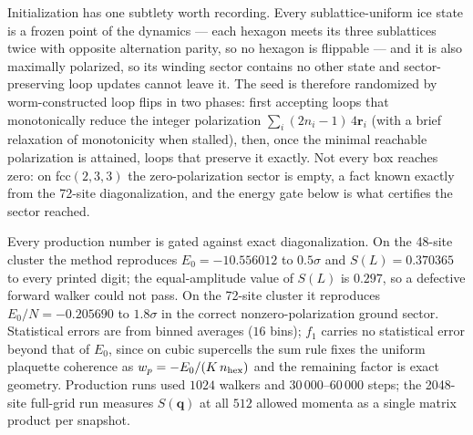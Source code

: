\documentclass[aps,prl,twocolumn,amsmath,amssymb,superscriptaddress,
longbibliography,floatfix]{revtex4-2}
\newcommand{\bq}{\bm q}
\begin{document}
Initialization has one subtlety worth recording. Every
sublattice-uniform ice state is a frozen point of the dynamics ---
each hexagon meets its three sublattices twice with opposite
alternation parity, so no hexagon is flippable --- and it is also
maximally polarized, so its winding sector contains no other state and
sector-preserving loop updates cannot leave it. The seed is therefore
randomized by worm-constructed loop flips in two phases: first
accepting loops that monotonically reduce the integer polarization
$\sum_i(2n_i-1)\,4\bm r_i$ (with a brief relaxation of monotonicity
when stalled), then, once the minimal reachable polarization is
attained, loops that preserve it exactly. Not every box reaches zero:
on fcc$(2,3,3)$ the zero-polarization sector is empty, a fact known
exactly from the 72-site diagonalization, and the energy gate below is
what certifies the sector reached.

Every production number is gated against exact diagonalization. On
the 48-site cluster the method reproduces
$E_0=-10.556012$ to $0.5\sigma$ and $S(L)=0.370365$ to every printed
digit; the equal-amplitude value of $S(L)$ is $0.297$, so a defective
forward walker could not pass. On the 72-site cluster it reproduces
$E_0/N=-0.205690$ to $1.8\sigma$ in the correct nonzero-polarization
ground sector. Statistical errors are from binned averages ($16$
bins); $f_1$ carries no statistical error beyond that of $E_0$, since
on cubic supercells the sum rule fixes the uniform plaquette coherence
as $w_p=-E_0/(K\,n_{\rm hex})$ and the remaining factor is exact
geometry. Production runs used $1024$ walkers and $30\,000$--$60\,000$
steps; the 2048-site full-grid run measures $S(\bq)$ at all $512$
allowed momenta as a single matrix product per snapshot.



\end{document}

